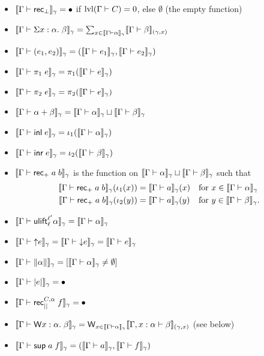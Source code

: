 \begin{itemize}
\item $\scott{\Gamma\vdash\rec_\bot}_\gamma=\bullet$ if $\lvl(\Gamma\vdash C)=0$, else $\emptyset$ (the empty function)
\item $\scott{\Gamma\vdash\Sigma x:\alpha.\;\beta}_\gamma=\sum_{x\in \scott{\Gamma\vdash\alpha}_\gamma}\scott{\Gamma\vdash\beta}_{(\gamma,x)}$
\item $\scott{\Gamma\vdash(e_1,e_2)}_\gamma=(\scott{\Gamma\vdash e_1}_\gamma,\scott{\Gamma\vdash e_2}_\gamma)$
\item $\scott{\Gamma\vdash\pi_1\;e}_\gamma=\pi_1(\scott{\Gamma\vdash e}_\gamma)$
\item $\scott{\Gamma\vdash\pi_2\;e}_\gamma=\pi_2(\scott{\Gamma\vdash e}_\gamma)$
\item $\scott{\Gamma\vdash\alpha+\beta}_\gamma=\scott{\Gamma\vdash\alpha}_\gamma\sqcup\scott{\Gamma\vdash\beta}_\gamma$
\item $\scott{\Gamma\vdash\inl e}_\gamma=\iota_1(\scott{\Gamma\vdash\alpha}_\gamma)$
\item $\scott{\Gamma\vdash\inr e}_\gamma=\iota_2(\scott{\Gamma\vdash\beta}_\gamma)$
\item $\scott{\Gamma\vdash\rec_+\;a\;b}_\gamma$ is the function on $\scott{\Gamma\vdash\alpha}_\gamma\sqcup\scott{\Gamma\vdash\beta}_\gamma$ such that
\begin{align*}
\scott{\Gamma\vdash\rec_+\;a\;b}_\gamma(\iota_1(x))&=\scott{\Gamma\vdash a}_\gamma(x)&&\mbox{for }x\in \scott{\Gamma\vdash\alpha}_\gamma\\
\scott{\Gamma\vdash\rec_+\;a\;b}_\gamma(\iota_2(y))&=\scott{\Gamma\vdash a}_\gamma(y)&&\mbox{for }y\in \scott{\Gamma\vdash\beta}_\gamma.
\end{align*}
\item $\scott{\Gamma\vdash\ulift_\ell^{\ell'} \alpha}_\gamma=\scott{\Gamma\vdash\alpha}_\gamma$
\item $\scott{\Gamma\vdash{\uparrow}e}_\gamma=\scott{\Gamma\vdash{\downarrow}e}_\gamma=\scott{\Gamma\vdash e}_\gamma$
\item $\scott{\Gamma\vdash\|\alpha\|}_\gamma=[\scott{\Gamma\vdash\alpha}_\gamma\ne \emptyset]$
\item $\scott{\Gamma\vdash|e|}_\gamma=\bullet$
\item $\scott{\Gamma\vdash\rec_{||}^{C,\alpha}\;f}_\gamma=\bullet$
\item $\scott{\Gamma\vdash\W x:\alpha.\;\beta}_\gamma=\W_{x\in\scott{\Gamma\vdash\alpha}_\gamma}\scott{\Gamma,x:\alpha\vdash\beta}_{(\gamma,x)}$ (see below)
\item $\scott{\Gamma\vdash\sup a\;f}_\gamma=(\scott{\Gamma\vdash a}_\gamma,\scott{\Gamma\vdash f}_\gamma)$

\end{itemize}
